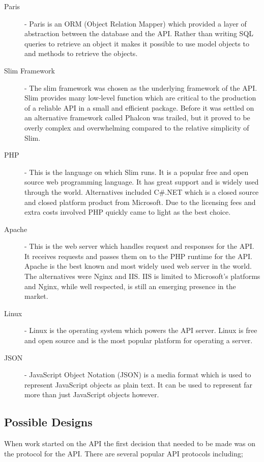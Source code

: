 \documentclass[11pt,a4paper]{report}
\begin{document}
\begin{description}
\item[Paris] - Paris is an ORM (Object Relation Mapper) which provided a layer of abstraction between the database and the API. Rather than writing SQL queries to retrieve an object it makes it possible to use model objects to and methods to retrieve the objects.  
\item[Slim Framework] - The slim framework was chosen as the underlying framework of the API. Slim provides many low-level function which are critical to the production of a reliable API in a small and efficient package. Before it was settled on an alternative framework called Phalcon was trailed, but it proved to be overly complex and overwhelming compared to the relative simplicity of Slim. 
\item[PHP] - This is the language on which Slim runs. It is a popular free and open source web programming language. It has great support and is widely used through the world. Alternatives included C\#.NET which is a closed source and closed platform product from Microsoft. Due to the licensing fees and extra costs involved PHP quickly came to light as the best choice. 
\item[Apache] - This is the web server which handles request and responses for the API. It receives requests and passes them on to the PHP runtime for the API. Apache is the best known and most widely used web server in the world. The alternatives were Nginx and IIS. IIS is limited to Microsoft's platforms and Nginx, while well respected, is still an emerging presence in the market. 
\item[Linux] - Linux is the operating system which powers the API server. Linux is free and open source and is the most popular platform for operating a server.
\item[JSON] - JavaScript Object Notation (JSON) is a media format which is used to represent JavaScript objects as plain text. It can be used to represent far more than just JavaScript objects however. 
\end{description}

\subsection{Possible Designs}
\label{sec:api:rejected-designs} %
When work started on the API the first decision that needed to be made was on the protocol for the API. There are several popular API protocols including;
\end{document}
